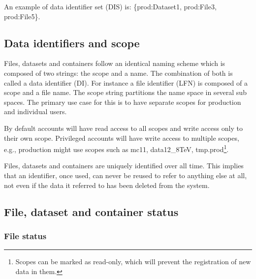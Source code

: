 \documentclass{atlasnote}
\begin{document}
{\hfill{}\hfill}

An example of data identifier set (DIS) is: \{prod:Dataset1, prod:File3, prod:File5\}.

\subsection{Data identifiers and scope}
\label{overview_Dataset:data-identifiers-and-scope}

Files, datasets and containers follow an identical naming scheme which is composed of two strings: the scope and a name.
The combination of both is called a data identifier (DI). For instance a file identifier (LFN) is composed of a scope and a file name.
The scope string partitions the name space in several sub spaces. The primary use case for this is to have separate scopes for production and individual users.

By default accounts will have read access to all scopes and write access only to their own scope.
Privileged accounts will have write access to multiple scopes, e.g., production might use scopes such as mc11, data12\_8TeV, tmp.prod\footnote{Scopes can be marked as read-only, which will prevent the registration of new data in them.}.

Files, datasets and containers are uniquely identified over all time. This implies that an identifier, once used,
can never be reused to refer to anything else at all, not even if the data it referred to has been deleted from the system.

\subsection{File, dataset and container status}

\subsubsection{File status}
\label{sec:file-status}
\end{document}
